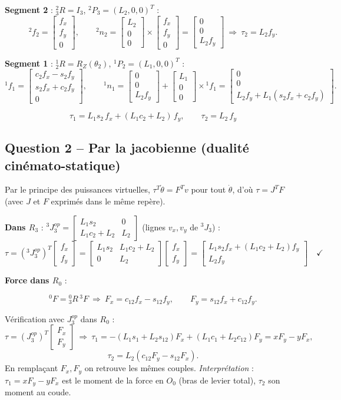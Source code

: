 \documentclass[11pt,a4paper]{article}
\newcommand{\col}[3]{\begin{bmatrix}#1\\#2\\#3\end{bmatrix}}
\begin{document}
\textbf{Segment 2} : ${}^2_3R=I_3$, ${}^2P_3=(L_2,0,0)^T$ :
\[{}^2f_2=\col{f_x}{f_y}0,\qquad {}^2n_2=\col{L_2}00\times\col{f_x}{f_y}0=\col00{L_2f_y}\ \Rightarrow\ \tau_2=L_2f_y.\]

\textbf{Segment 1} : ${}^1_2R=R_Z(\theta_2)$, ${}^1P_2=(L_1,0,0)^T$ :
\[{}^1f_1=\col{c_2f_x-s_2f_y}{s_2f_x+c_2f_y}0,\qquad {}^1n_1=\col00{L_2f_y}+\col{L_1}00\times{}^1f_1=\col00{L_2f_y+L_1(s_2f_x+c_2f_y)}.\]
\begin{res}
\[\tau_1=L_1s_2\,f_x+(L_1c_2+L_2)\,f_y,\qquad \tau_2=L_2\,f_y\]
\end{res}

\subsection*{Question 2 -- Par la jacobienne (dualité cinémato-statique)}
Par le principe des puissances virtuelles, $\tau^T\dot\theta=F^Tv$ pour tout $\dot\theta$, d'où $\tau=J^TF$ (avec $J$ et $F$ exprimés dans le même repère).

\textbf{Dans $R_3$} : ${}^3J_3^{op}=\begin{bmatrix}L_1s_2&0\\L_1c_2+L_2&L_2\end{bmatrix}$ (lignes $v_x,v_y$ de ${}^3J_3$) :
\[\tau=({}^3J_3^{op})^T\begin{bmatrix}f_x\\f_y\end{bmatrix}=\begin{bmatrix}L_1s_2&L_1c_2+L_2\\0&L_2\end{bmatrix}\begin{bmatrix}f_x\\f_y\end{bmatrix}=\begin{bmatrix}L_1s_2f_x+(L_1c_2+L_2)f_y\\L_2f_y\end{bmatrix}\quad\checkmark\]

\textbf{Force dans $R_0$} :
\begin{res}
\[{}^0F={}^0_3R\,{}^3F\ \Rightarrow\ F_x=c_{12}f_x-s_{12}f_y,\qquad F_y=s_{12}f_x+c_{12}f_y.\]
\end{res}
Vérification avec $J_3^{op}$ dans $R_0$ :
\[\tau=(J_3^{op})^T\begin{bmatrix}F_x\\F_y\end{bmatrix}\ \Rightarrow\ 
\tau_1=-(L_1s_1+L_2s_{12})F_x+(L_1c_1+L_2c_{12})F_y=xF_y-yF_x,\]\[
\tau_2=L_2(c_{12}F_y-s_{12}F_x).\]
En remplaçant $F_x,F_y$ on retrouve les mêmes couples. \emph{Interprétation} : $\tau_1=xF_y-yF_x$ est le moment de la force en $O_0$ (bras de levier total), $\tau_2$ son moment au coude.
\end{document}
